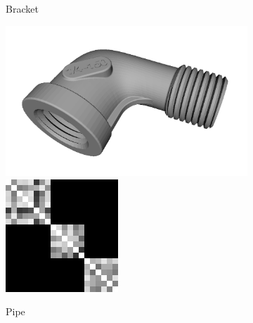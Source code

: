\begin{figure}[ht]
\begin{subfigure}[b]{0.23\linewidth}
		\caption{Bracket}
	\end{subfigure}
	\begin{subfigure}[b]{0.23\linewidth}
		\includegraphics[width=\linewidth]{fig/reg/pipe.png} \\
		\includegraphics[width=\linewidth]{fig/reg/reg3Dtrain_pipe.png} 
		\caption{Pipe}
	\end{subfigure}
	\begin{subfigure}[b]{0.23\linewidth}

\end{subfigure}
\end{figure}
